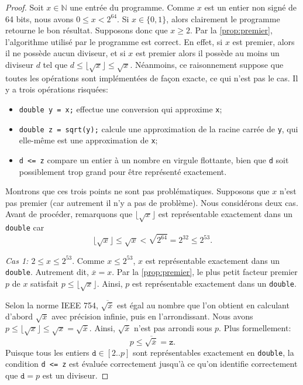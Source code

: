 \documentclass{article}
\newcommand{\N}{\mathbb{N}}
\begin{document}
\begin{proof}
  Soit $x \in \N$ une entrée du programme. Comme $x$ est un entier non
  signé de 64 bits, nous avons $0 \leq x < 2^{64}$. Si $x \in \{0,
  1\}$, alors clairement le programme retourne le bon
  résultat. Supposons donc que $x \geq 2$. Par la \cref{prop:premier},
  l'algorithme utilisé par le programme est correct. En effet, si $x$
  est premier, alors il ne possède aucun diviseur, et si $x$ est
  premier alors il possède au moins un diviseur $d$ tel que $d \leq
  \lfloor \sqrt{x} \rfloor \leq \sqrt{x}$. Néanmoins, ce raisonnement
  suppose que toutes les opérations sont implémentées de façon
  exacte, ce qui n'est pas le cas. Il y a trois opérations risquées:

  \smallskip
  \begin{itemize}
    \setlength\itemsep{3pt}
    
  \item \og \texttt{double y = x;} \fg{} effectue une
    conversion qui approxime \texttt{x};

  \item \og \texttt{double z = sqrt(y);} \fg{} calcule une
    approximation de la racine carrée de \texttt{y}, qui elle-même est
    une approximation de \texttt{x};

  \item \og \texttt{d <= z} \fg{} compare un entier à un
    nombre en virgule flottante, bien que \texttt{d} soit possiblement
    trop grand pour être représenté exactement.
  \end{itemize}
  \smallskip

  Montrons que ces trois points ne sont pas problématiques. Supposons
  que $x$ n'est pas premier (car autrement il n'y a pas de
  problème). Nous considérons deux cas. Avant de procéder, remarquons
  que $\lfloor\sqrt{x}\rfloor$ est représentable exactement dans un
  \texttt{double} car
  \[
  \lfloor\sqrt{x}\rfloor
  \leq \sqrt{x}
  < \sqrt{2^{64}}
  = 2^{32}
  \leq 2^{53}.
  \]

  \medskip\noindent\emph{Cas 1: $2 \leq x \leq 2^{53}$}. Comme $x \leq
  2^{53}$, $x$ est représentable exactement dans un
  \texttt{double}. Autrement dit, $\overline{x} = x$. Par la
  \cref{prop:premier}, le plus petit facteur premier $p$ de $x$
  satisfait $p \leq \lfloor \sqrt{x} \rfloor$. Ainsi, $p$ est
  représentable exactement dans un \texttt{double}.

  Selon la norme IEEE 754, $\overline{\sqrt{\overline{x}}}$ est égal
  au nombre que l'on obtient en calculant d'abord
  $\sqrt{\overline{x}}$ avec précision infinie, puis en
  l'arrondissant. Nous avons $p \leq \lfloor \sqrt{x} \rfloor \leq
  \sqrt{x} = \sqrt{\overline{x}}$. Ainsi, $\sqrt{\overline{x}}$ n'est
  pas arrondi sous $p$. Plus formellement:
  \[
  p \leq \overline{\sqrt{\overline{x}}} = \texttt{z}.
  \]
  Puisque tous les entiers $\texttt{d} \in [2..p]$ sont représentables
  exactement en \texttt{double}, la condition \og
  \texttt{d <= z} \fg{} est évaluée correctement jusqu'à ce
  qu'on identifie correctement que $\texttt{d} = p$ est un diviseur.


\end{proof}
\end{document}

